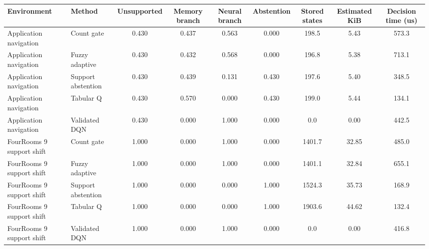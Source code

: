 \begin{tabular}{llccccccc}
\toprule
Environment & Method & Unsupported & Memory branch & Neural branch & Abstention & Stored states & Estimated KiB & Decision time (us) \\
\midrule
Application navigation & Count gate & 0.430 & 0.437 & 0.563 & 0.000 & 198.5 & 5.43 & 573.3 \\
Application navigation & Fuzzy adaptive & 0.430 & 0.432 & 0.568 & 0.000 & 196.8 & 5.38 & 713.1 \\
Application navigation & Support abstention & 0.430 & 0.439 & 0.131 & 0.430 & 197.6 & 5.40 & 348.5 \\
Application navigation & Tabular Q & 0.430 & 0.570 & 0.000 & 0.430 & 199.0 & 5.44 & 134.1 \\
Application navigation & Validated DQN & 0.430 & 0.000 & 1.000 & 0.000 & 0.0 & 0.00 & 442.5 \\
FourRooms 9 support shift & Count gate & 1.000 & 0.000 & 1.000 & 0.000 & 1401.7 & 32.85 & 485.0 \\
FourRooms 9 support shift & Fuzzy adaptive & 1.000 & 0.000 & 1.000 & 0.000 & 1401.1 & 32.84 & 655.1 \\
FourRooms 9 support shift & Support abstention & 1.000 & 0.000 & 0.000 & 1.000 & 1524.3 & 35.73 & 168.9 \\
FourRooms 9 support shift & Tabular Q & 1.000 & 0.000 & 0.000 & 1.000 & 1903.6 & 44.62 & 132.4 \\
FourRooms 9 support shift & Validated DQN & 1.000 & 0.000 & 1.000 & 0.000 & 0.0 & 0.00 & 416.8 \\
\bottomrule
\end{tabular}
